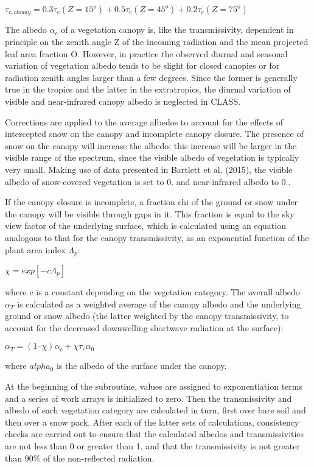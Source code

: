 $\tau_{c,cloudy} = 0.3 \tau_c(Z=15^o) + 0.5 \tau_c(Z=45^o) + 0.2 \tau_c(Z=75^o)$

The albedo $\alpha_c$ of a vegetation canopy is, like the transmissivity, dependent in principle on the zenith angle Z of the incoming radiation and the mean projected leaf area fraction O. However, in practice the observed diurnal and seasonal variation of vegetation albedo tends to be slight for closed canopies or for radiation zenith angles larger than a few degrees. Since the former is generally true in the tropics and the latter in the extratropics, the diurnal variation of visible and near-\/infrared canopy albedo is neglected in C\+L\+A\+S\+S.

Corrections are applied to the average albedos to account for the effects of intercepted snow on the canopy and incomplete canopy closure. The presence of snow on the canopy will increase the albedo; this increase will be larger in the visible range of the spectrum, since the visible albedo of vegetation is typically very small. Making use of data presented in Bartlett et al. (2015), the visible albedo of snow-\/covered vegetation is set to 0. and near-\/infrared albedo to 0..

If the canopy closure is incomplete, a fraction chi of the ground or snow under the canopy will be visible through gaps in it. This fraction is equal to the sky view factor of the underlying surface, which is calculated using an equation analogous to that for the canopy transmissivity, as an exponential function of the plant area index $\Lambda_p$\+:

$\chi = exp[-c\Lambda_p]$

where c is a constant depending on the vegetation category. The overall albedo $\alpha_T$ is calculated as a weighted average of the canopy albedo and the underlying ground or snow albedo (the latter weighted by the canopy transmissivity, to account for the decreased downwelling shortwave radiation at the surface)\+:

$\alpha_T = (1 – \chi) \alpha_c + \chi \tau_c \alpha_0$

where $alpha_0$ is the albedo of the surface under the canopy.

At the beginning of the subroutine, values are assigned to exponentiation terms and a series of work arrays is initialized to zero. Then the transmissivity and albedo of each vegetation category are calculated in turn, first over bare soil and then over a snow pack. After each of the latter sets of calculations, consistency checks are carried out to ensure that the calculated albedos and transmissivities are not less than 0 or greater than 1, and that the transmissivity is not greater than 90\% of the non-\/reflected radiation.

